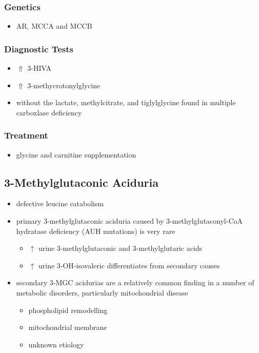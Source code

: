 \documentclass{scrartcl}
\begin{document}
\subsubsection{Genetics}
\label{sec:org0b7ef5a}
\begin{itemize}
\item AR, MCCA and MCCB
\end{itemize}
\subsubsection{Diagnostic Tests}
\label{sec:org96b07b3}
\begin{itemize}
\item \(\Uparrow\) 3-HIVA
\item \(\Uparrow\) 3-methycrotonylglycine
\item without the lactate, methylcitrate, and tiglylglycine found in
multiple carboxlase deficiency
\end{itemize}

\subsubsection{Treatment}
\label{sec:orgd8bde45}
\begin{itemize}
\item glycine and carnitine supplementation
\end{itemize}

\subsection{3-Methylglutaconic Aciduria}
\label{sec:orgb4f9ba5}
\begin{itemize}
\item defective leucine catabolism
\item primary 3-methylglutaconic aciduria caused by 3-methylglutaconyl-CoA
hydratase deficiency (AUH mutations) is very rare
\begin{itemize}
\item \(\uparrow\) urine 3-methylglutaconic and 3-methylglutaric acids
\item \(\uparrow\) urine 3-OH-isovaleric differentiates from secondary causes
\end{itemize}
\item secondary 3-MGC acidurias are a relatively common finding in a
number of metabolic disorders, particularly mitochondrial disease
\begin{itemize}
\item phospholipid remodelling
\item mitochondrial membrane
\item unknown etiology
\end{itemize}
\end{itemize}
\end{document}
